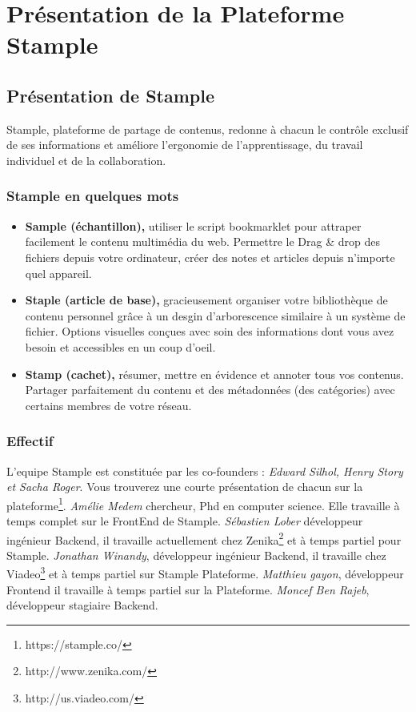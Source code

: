 \chapter{Présentation de la Plateforme Stample}
\section{Présentation de Stample}
Stample, plateforme de partage de contenus, redonne à chacun le contrôle exclusif de ses informations et améliore l'ergonomie de l'apprentissage, du travail individuel et de la collaboration.
\subsection{Stample en quelques mots}
\begin{itemize}
\item \textbf{Sample (échantillon),} utiliser le script bookmarklet pour attraper facilement le contenu multimédia du web. Permettre le Drag \& drop des fichiers depuis votre ordinateur, créer des notes et articles depuis n'importe quel appareil.
\item \textbf{Staple (article de base),} gracieusement organiser votre bibliothèque de contenu personnel grâce à un desgin d'arborescence similaire à un système de fichier.
Options visuelles conçues avec soin des informations dont vous avez besoin et accessibles en un coup d'oeil.
\item \textbf{Stamp (cachet),} résumer, mettre en évidence et annoter tous vos contenus.
Partager parfaitement du contenu et des métadonnées (des catégories) avec certains membres de votre réseau.
\end{itemize}
\newpage
\subsection{Effectif}
L'equipe Stample est constituée par les co-founders :
\textit{Edward Silhol, Henry Story et Sacha Roger}. Vous trouverez une courte présentation de chacun sur la plateforme\footnote{https://stample.co/}.\newline
\textit{Amélie Medem} chercheur, Phd en computer science. Elle travaille à temps complet sur le FrontEnd de Stample.\newline
\textit{Sébastien Lober} développeur ingénieur Backend, il travaille actuellement chez Zenika\footnote{http://www.zenika.com/} et à temps partiel pour Stample.\newline
\textit{Jonathan Winandy}, développeur ingénieur Backend, il travaille chez Viadeo\footnote{http://us.viadeo.com/} et à temps partiel sur Stample Plateforme.\newline
\textit{Matthieu gayon}, développeur Frontend il travaille à temps partiel sur la Plateforme.\newline
\textit{Moncef Ben Rajeb}, développeur stagiaire Backend.
